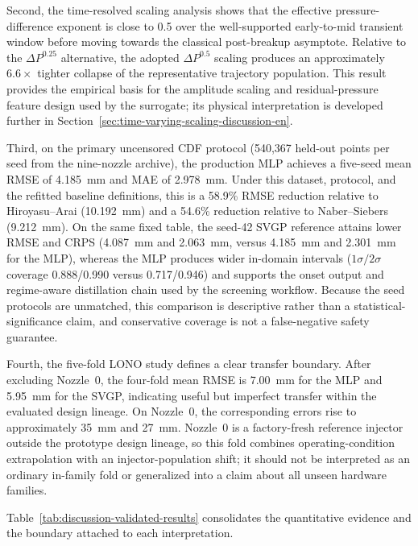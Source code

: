 Second, the time-resolved scaling analysis shows that the effective pressure-difference exponent is close to 0.5 over the well-supported early-to-mid transient window before moving towards the classical post-breakup asymptote.
Relative to the \(\Delta P^{0.25}\) alternative, the adopted \(\Delta P^{0.5}\) scaling produces an approximately \(6.6\times\) tighter collapse of the representative trajectory population.
This result provides the empirical basis for the amplitude scaling and residual-pressure feature design used by the surrogate; its physical interpretation is developed further in Section~\ref{sec:time-varying-scaling-discussion-en}.

Third, on the primary uncensored CDF protocol (540{,}367 held-out points per seed from the nine-nozzle archive), the production MLP achieves a five-seed mean RMSE of \SI{4.185}{mm} and MAE of \SI{2.978}{mm}.
Under this dataset, protocol, and the refitted baseline definitions, this is a 58.9\% RMSE reduction relative to Hiroyasu--Arai (\SI{10.192}{mm}) and a 54.6\% reduction relative to Naber--Siebers (\SI{9.212}{mm}).
On the same fixed table, the seed-42 SVGP reference attains lower RMSE and CRPS (\SI{4.087}{mm} and \SI{2.063}{mm}, versus \SI{4.185}{mm} and \SI{2.301}{mm} for the MLP), whereas the MLP produces wider in-domain intervals (\(1\sigma/2\sigma\) coverage 0.888/0.990 versus 0.717/0.946) and supports the onset output and regime-aware distillation chain used by the screening workflow.
Because the seed protocols are unmatched, this comparison is descriptive rather than a statistical-significance claim, and conservative coverage is not a false-negative safety guarantee.

Fourth, the five-fold LONO study defines a clear transfer boundary.
After excluding Nozzle~0, the four-fold mean RMSE is \SI{7.00}{mm} for the MLP and \SI{5.95}{mm} for the SVGP, indicating useful but imperfect transfer within the evaluated design lineage.
On Nozzle~0, the corresponding errors rise to approximately \SI{35}{mm} and \SI{27}{mm}.
Nozzle~0 is a factory-fresh reference injector outside the prototype design lineage, so this fold combines operating-condition extrapolation with an injector-population shift; it should not be interpreted as an ordinary in-family fold or generalized into a claim about all unseen hardware families.

Table~\ref{tab:discussion-validated-results} consolidates the quantitative evidence and the boundary attached to each interpretation.

